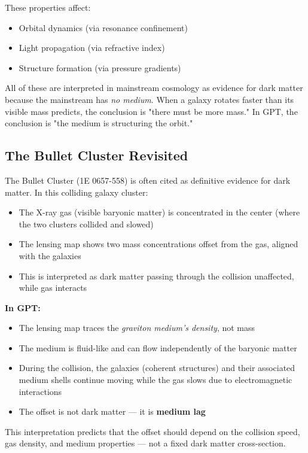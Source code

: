 \documentclass[12pt, a4paper]{article}
\begin{document}
These properties affect:
\begin{itemize}
    \item Orbital dynamics (via resonance confinement)
    \item Light propagation (via refractive index)
    \item Structure formation (via pressure gradients)
\end{itemize}

All of these are interpreted in mainstream cosmology as evidence for dark matter because the mainstream has \textit{no medium}. When a galaxy rotates faster than its visible mass predicts, the conclusion is "there must be more mass." In GPT, the conclusion is "the medium is structuring the orbit."

\subsection{The Bullet Cluster Revisited}
\label{subsec:bullet_cluster}

The Bullet Cluster (1E 0657-558) is often cited as definitive evidence for dark matter. In this colliding galaxy cluster:
\begin{itemize}
    \item The X-ray gas (visible baryonic matter) is concentrated in the center (where the two clusters collided and slowed)
    \item The lensing map shows two mass concentrations offset from the gas, aligned with the galaxies
    \item This is interpreted as dark matter passing through the collision unaffected, while gas interacts
\end{itemize}

\textbf{In GPT:}
\begin{itemize}
    \item The lensing map traces the \textit{graviton medium's density}, not mass
    \item The medium is fluid-like and can flow independently of the baryonic matter
    \item During the collision, the galaxies (coherent structures) and their associated medium shells continue moving while the gas slows due to electromagnetic interactions
    \item The offset is not dark matter — it is \textbf{medium lag}
\end{itemize}

This interpretation predicts that the offset should depend on the collision speed, gas density, and medium properties — not a fixed dark matter cross-section.
\end{document}
